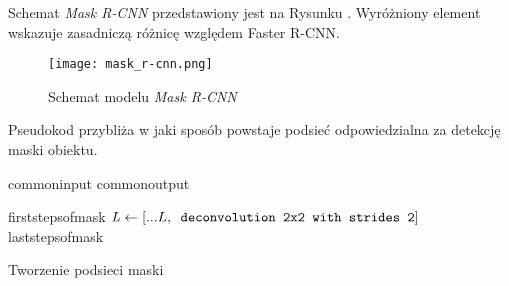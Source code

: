 Schemat \textit{Mask R-CNN} przedstawiony jest na Rysunku . Wyróżniony element wskazuje zasadniczą różnicę względem Faster R-CNN.

\begin{figure}[h]
  \centering
  \texttt{[image: mask\_r-cnn.png]}
  \caption{Schemat modelu \textit{Mask R-CNN}}
  \label{fig:mask_r_cnn}
\end{figure}

Pseudokod  przybliża w jaki sposób powstaje podsieć odpowiedzialna za detekcję maski obiektu.

\begin{algorithm}
  {commoninput}
  {commonoutput}
  \begin{algorithmic}[1]
    {firststepsofmask}
    \State $\mathit{L} \gets [...L,\verb| deconvolution 2x2 with strides 2|]$
    {laststepsofmask}
	\end{algorithmic}
	\caption{Tworzenie podsieci maski}
	\label{alg:mask-r-cnn}
\end{algorithm}
